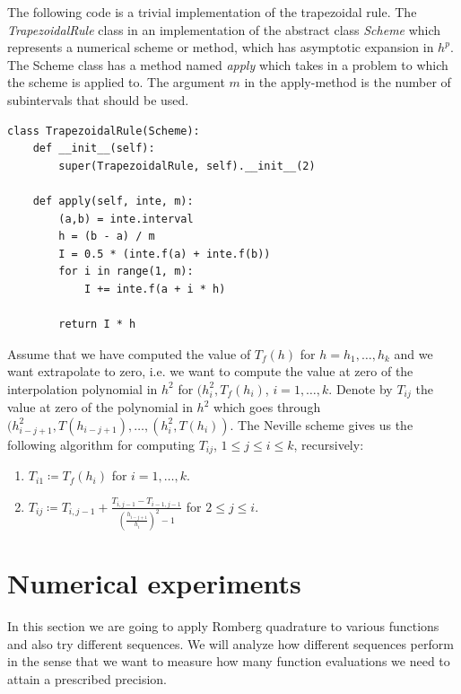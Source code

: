 The following code is a trivial implementation of the trapezoidal rule. The {\it TrapezoidalRule} class in an implementation of the abstract class {\it Scheme} which represents a numerical scheme or method, which has asymptotic expansion in \(h^p\). The Scheme class has a method named {\it apply} which takes in a problem to which the scheme is applied to. The argument \(m\) in the apply-method is the number of subintervals that should be used.

\begin{verbatim}
class TrapezoidalRule(Scheme):
    def __init__(self):
        super(TrapezoidalRule, self).__init__(2)

    def apply(self, inte, m):
        (a,b) = inte.interval
        h = (b - a) / m
        I = 0.5 * (inte.f(a) + inte.f(b))
        for i in range(1, m):
            I += inte.f(a + i * h)

        return I * h
\end{verbatim}

Assume that we have computed the value of \(T_f(h)\) for \(h = h_1,\ldots,h_k\) and we want extrapolate to zero, i.e. we want to compute the value at zero of the interpolation polynomial in \(h^2\) for \((h_i^2,T_f(h_i)\), \(i=1,\ldots,k\). Denote by \(T_{ij}\) the value at zero of the polynomial in \(h^2\) which goes through \((h_{i-j+1}^2, T(h_{i-j+1}),\ldots,(h_i^2,T(h_i))\). The Neville scheme gives us the following algorithm for computing \(T_{ij}\), \(1\leq j\leq i\leq k\), recursively:

\begin{enumerate}
    \item \(T_{i1} \coloneqq T_f(h_i)\) for \(i = 1,\ldots,k\).
    \item \(T_{ij} \coloneqq T_{i,j-1} + \frac{T_{i,j-1} - T_{i-1,j-1}}{\left(\frac{h_{i-j+1}}{h_i}\right)^2 - 1}\) for \(2\leq j\leq i\).
\end{enumerate}

\section{Numerical experiments}

In this section we are going to apply Romberg quadrature to various functions and also try different sequences. We will analyze how different sequences perform in the sense that we want to measure how many function evaluations we need to attain a prescribed precision.\\

